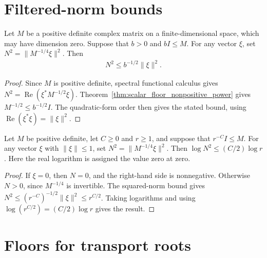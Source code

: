 \section{Filtered-norm bounds}

\begin{theorem}
    \label{thm:scalar_floor_filtered_norm}
    \leanok
    Let $M$ be a positive definite complex matrix on a finite-dimensional
    space, which may have dimension zero. Suppose that $b>0$ and $bI\le M$.
    For any vector $\xi$, set $N^2=\|M^{-1/4}\xi\|^2$. Then
    \begin{align}
        N^2\le b^{-1/2}\|\xi\|^2.
    \end{align}
\end{theorem}

\begin{proof}
    \leanok
    Since $M$ is positive definite, spectral functional calculus gives
    $N^2=\operatorname{Re}(\xi^*M^{-1/2}\xi)$.
    Theorem~\ref{thm:scalar_floor_nonpositive_power} gives
    $M^{-1/2}\le b^{-1/2}I$. The quadratic-form order then gives the
    stated bound, using $\operatorname{Re}(\xi^*\xi)=\|\xi\|^2$.
\end{proof}

\begin{theorem}
    \label{thm:polynomial_floor_filtered_log}
    \leanok
    Let $M$ be positive definite, let $C\ge0$ and $r\ge1$, and suppose
    that $r^{-C}I\le M$. For any vector $\xi$ with $\|\xi\|\le1$, set
    $N^2=\|M^{-1/4}\xi\|^2$. Then
    $\log N^2\le (C/2)\log r$.
    Here the real logarithm is assigned the value zero at zero.
\end{theorem}

\begin{proof}
    \leanok
    If $\xi=0$, then $N=0$, and the right-hand side is nonnegative.
    Otherwise $N>0$, since $M^{-1/4}$ is invertible. The squared-norm
    bound gives $N^2\le(r^{-C})^{-1/2}\|\xi\|^2\le r^{C/2}$.
    Taking logarithms and using $\log(r^{C/2})=(C/2)\log r$ gives the result.
\end{proof}


\section{Floors for transport roots}

